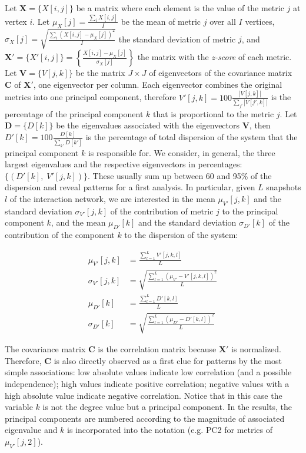 Let $\mathbf{X}=\{X[i,j]\}$ be a matrix where each element is the value
of the metric $j$ at vertex $i$.
Let
$\mu_X [j]=\frac{\sum_i X[i,j]}{I}$ be the mean of metric $j$ over all $I$ vertices, 
$\sigma_X [j]=\sqrt{\frac{\sum_i (X[i,j]-\mu_X [j])^2}{I}}$ the standard deviation of metric $j$,
and $\mathbf{X'}=\{X'[i,j]\}=\left\{\frac{X[i,j]-\mu_X[j]}{\sigma_X[j]}\right\}$ 
the matrix with the \emph{z-score} of each metric. 
Let $\mathbf{V}=\{V[j,k]\}$ be the matrix $J\times J$ of eigenvectors
of the covariance matrix $\mathbf{C}$
of $\mathbf{X'}$, one eigenvector per column.
Each eigenvector combines the original metrics into one principal component, therefore
$V'[j,k]=100\frac{|V[j,k]|}{\sum_{j'} |V[j',k]|}$
is the percentage of the principal component $k$
that is proportional to the metric $j$.
Let $\mathbf{D}=\{D[k]\}$ be the eigenvalues associated with the eigenvectors $\mathbf{V}$,
then $D'[k]=100\frac{D[k]}{\sum_{k'}D[k']}$
is the percentage of total dispersion of the system that the principal component $k$
is responsible for.
We consider, in general, the three largest eigenvalues and
the respective eigenvectors in percentages:
$\{(D'[k],\;V'[j,k])\}$.
These usually sum up between 60 and 95\% of the dispersion
and reveal patterns for a first analysis.
In particular, 
given $L$ snapshots $l$ of the interaction network,
we are interested in the mean
$\mu_{V'}[j,k]$
and the standard deviation $\sigma_{V'}[j,k]$ 
of the contribution of metric $j$ to the principal component $k$,
and the mean
$\mu_{D'}[k]$
and the standard deviation 
$\sigma_{D'}[k]$
of the contribution of the component $k$ to the dispersion
of the system:

\begin{align}\label{eq:pca}
\mu_{V'}[j,k] &=\frac{\sum_{l=1}^L V'[j,k,l]}{L}\nonumber\\
\sigma_{V'}[j,k]&=\sqrt{\frac{\sum_{l=1}^L (\mu_{V'}-V'[j,k,l])^2}{L}}\\\nonumber
\mu_{D'}[k]&=\frac{\sum_{l=1}^L D'[k,l]}{L}\\\nonumber
\sigma_{D'}[k]&=\sqrt{\frac{\sum_{l=1}^L (\mu_{D'}-D'[k,l])^2}{L}}
\end{align}

The covariance matrix 
$\mathbf{C}$ is the correlation matrix because $\mathbf{X'}$ is normalized.
Therefore, $\mathbf{C}$ is also directly observed as a first clue for patterns
by the most simple associations:
low absolute values indicate low correlation (and a possible independence);
high values indicate positive correlation;
negative values with a high absolute value indicate negative correlation.
Notice that in this case the variable $k$ is not the degree value
but a principal component.
In the results, the principal components are numbered
according to the magnitude of associated eigenvalue and $k$ is incorporated into
the notation (e.g. PC2 for metrics of $\mu_{V'}[j,2]$).


